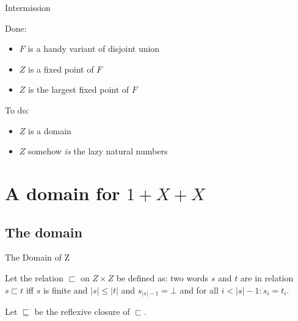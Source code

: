 \documentclass{beamer}
\begin{document}
\begin{frame}{Intermission}

Done:

\begin{itemize}
  \item $F$ is a handy variant of disjoint union
  \item $Z$ is a fixed point of $F$
  \item $Z$ is the largest fixed point of $F$
\end{itemize}

To do:

\begin{itemize}
  \item $Z$ is a domain
  \item $Z$ somehow \emph{is} the lazy natural numbers
\end{itemize}

\end{frame}


\section{A domain for $1+X+X$}

\subsection{The domain}

\begin{frame}{The Domain of Z}

Let the relation $\sqsubset$ on $Z \times Z$ be defined as: two
words $s$ and $t$ are in relation $s \sqsubset t$ iff $s$ is finite and $|s|
\leq |t|$ and $s_{|s|-1} = \bot$ and for all $i < |s|-1: s_i = t_i$.

\bigskip

Let $\sqsubseteq$ be the reflexive closure of $\sqsubset$.

\end{frame}
\end{document}
